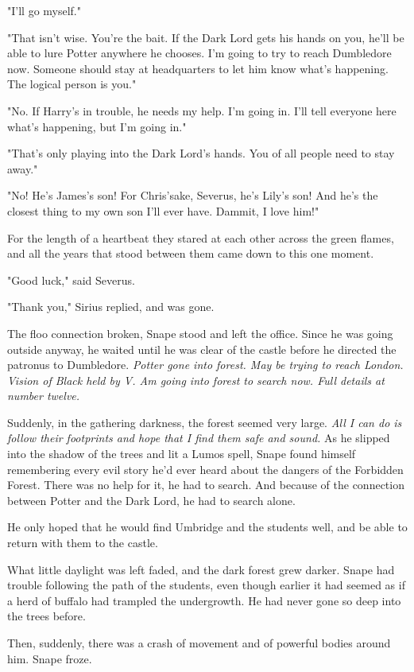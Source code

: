 \documentclass[a4paper,11pt]{article}
\begin{document}
"I'll go myself."

"That isn't wise. You're the bait. If the Dark Lord gets his hands on you, he'll be able to lure Potter anywhere he chooses. I'm going to try to reach Dumbledore now. Someone should stay at headquarters to let him know what's happening. The logical person is you."

"No. If Harry's in trouble, he needs my help. I'm going in. I'll tell everyone here what's happening, but I'm going in."

"That's only playing into the Dark Lord's hands. You of all people need to stay away."

"No! He's James's son! For Chris'sake, Severus, he's Lily's son! And he's the closest thing to my own son I'll ever have. Dammit, I love him!"

For the length of a heartbeat they stared at each other across the green flames, and all the years that stood between them came down to this one moment.

"Good luck," said Severus.

"Thank you," Sirius replied, and was gone.

The floo connection broken, Snape stood and left the office. Since he was going outside anyway, he waited until he was clear of the castle before he directed the patronus to Dumbledore. \emph{Potter gone into forest. May be trying to reach London. Vision of Black held by V. Am going into forest to search now. Full details at number twelve.}

Suddenly, in the gathering darkness, the forest seemed very large. \emph{All I can do is follow their footprints and hope that I find them safe and sound.} As he slipped into the shadow of the trees and lit a Lumos spell, Snape found himself remembering every evil story he'd ever heard about the dangers of the Forbidden Forest. There was no help for it, he had to search. And because of the connection between Potter and the Dark Lord, he had to search alone.

He only hoped that he would find Umbridge and the students well, and be able to return with them to the castle.

What little daylight was left faded, and the dark forest grew darker. Snape had trouble following the path of the students, even though earlier it had seemed as if a herd of buffalo had trampled the undergrowth. He had never gone so deep into the trees before.

Then, suddenly, there was a crash of movement and of powerful bodies around him. Snape froze.
\end{document}
